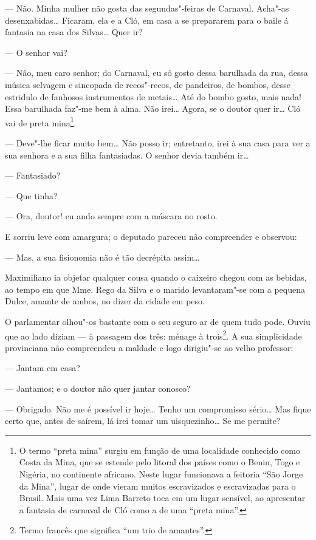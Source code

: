 --- Não. Minha mulher não gosta das segundas"-feiras de Carnaval. Acha"-as
desenxabidas\ldots{} Ficaram, ela e a Cló, em casa a se prepararem para o
baile á fantasia na casa dos Silvas\ldots{} Quer ir?

--- O senhor vai?

--- Não, meu caro senhor; do Carnaval, eu só gosto dessa barulhada da
rua, dessa música selvagem e sincopada de recos"-recos, de pandeiros, de
bombos, desse estridulo de fanhosos instrumentos de metais\ldots{} Até do
bombo gosto, mais nada! Essa barulhada faz"-me bem à alma. Não irei\ldots{}
Agora, se o doutor quer ir\ldots{} Cló vai de preta mina\footnote{O termo
  ``preta mina'' surgiu em função de uma localidade conhecido como Costa
  da Mina, que se estende pelo litoral dos países como o Benin, Togo e
  Nigéria, no continente africano. Neste lugar funcionava a feitoria
  ``São Jorge da Mina'', lugar de onde vieram muitos escravizados e
  escravizadas para o Brasil. Mais uma vez Lima Barreto toca em um lugar
  sensível, ao apresentar a fantasia de carnaval de Cló como a de uma
  ``preta mina''.}.

--- Deve"-lhe ficar muito bem\ldots{} Não posso ir; entretanto, irei à sua casa
para ver a sua senhora e a sua filha fantasiadas. O senhor devia também
ir\ldots{}

--- Fantasiado?

--- Que tinha?

--- Ora, doutor! eu ando sempre com a máscara no rosto.

E sorriu leve com amargura; o deputado pareceu não compreender e
observou:

--- Mas, a sua fisionomia não é tão decrépita assim\ldots{}

Maximiliano ia objetar qualquer cousa quando o caixeiro chegou com as
bebidas, ao tempo em que Mme. Rego da Silva e o marido levantaram"-se com
a pequena Dulce, amante de ambos, no dizer da cidade em peso.

O parlamentar olhou"-os bastante com o seu seguro ar de quem tudo pode.
Ouviu que ao lado diziam --- à passagem dos três: ménage à
trois\footnote{Termo francês que significa ``um trio de amantes''.}. A
sua simplicidade provinciana não compreendeu a maldade e logo dirigiu"-se
ao velho professor:

--- Jantam em casa?

--- Jantamos; e o doutor não quer jantar conosco?

--- Obrigado. Não me é possível ir hoje\ldots{} Tenho um compromisso sério\ldots{}
Mas fique certo que, antes de saírem, lá irei tomar um uisquezinho\ldots{} Se
me permite?

